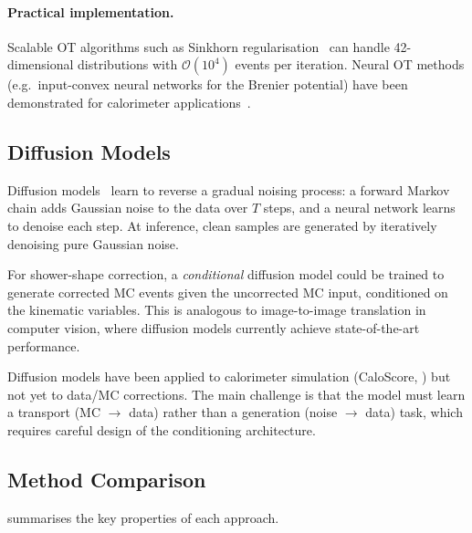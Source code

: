 \documentclass[11pt,a4paper]{article}
\begin{document}
\paragraph{Practical implementation.}
Scalable OT algorithms such as Sinkhorn regularisation~\cite{Cuturi:2013}
can handle 42-dimensional distributions with $\mathcal{O}(10^4)$
events per iteration.  Neural OT methods (e.g.\ input-convex neural
networks for the Brenier potential) have been demonstrated for
calorimeter applications~\cite{NachmanShih:2020}.

\subsection{Diffusion Models}
\label{sec:alternatives:diffusion}

Diffusion models~\cite{CaloScore:2022,Butter:2022} learn to reverse a
gradual noising process: a forward Markov chain adds Gaussian noise
to the data over $T$ steps, and a neural network learns to denoise
each step.  At inference, clean samples are generated by
iteratively denoising pure Gaussian noise.

For shower-shape correction, a \emph{conditional} diffusion model
could be trained to generate corrected MC events given the
uncorrected MC input, conditioned on the kinematic variables.
This is analogous to image-to-image translation in computer vision,
where diffusion models currently achieve state-of-the-art performance.

Diffusion models have been applied to calorimeter simulation
(CaloScore, \cite{CaloScore:2022}) but not yet to
data/MC corrections.  The main challenge is that the model must
learn a transport (MC $\to$ data) rather than a generation
(noise $\to$ data) task, which requires careful design of the
conditioning architecture.

\subsection{Method Comparison}
\label{sec:alternatives:comparison}

 summarises the key properties of each
approach.
\end{document}
